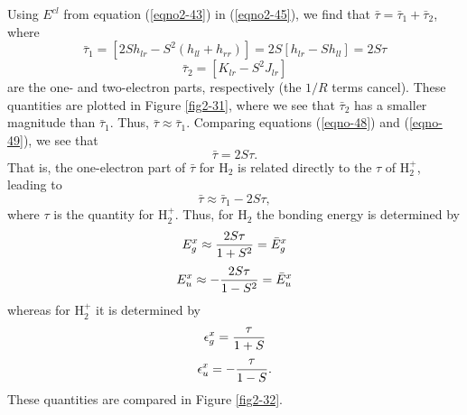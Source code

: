 Using $E^{cl}$ from equation (\ref{eqno2-43}) in (\ref{eqno2-45}), we
find that ${\bar{\tau}} = {\bar{\tau}}_1 + {\bar{\tau}}_2$, where
\begin{equation}
{\bar{\tau}}_1 = \left[ 2 S h_{lr} - S^2 \left( h_{ll} + h_{rr} 
\right) \right] = 2S \left[ h_{lr} - S h_{ll} \right] = 2S \tau
\end{equation}
\begin{equation}
{\bar{\tau}}_2 = \left[ K_{lr} - S^2 J_{lr} \right]
\end{equation}
are the one- and two-electron parts, respectively (the $1/R$ terms
cancel). These quantities are plotted in Figure \ref{fig2-31}, where
we see that ${\bar{\tau}}_2$ has a smaller magnitude than
${\bar{\tau}}_1$.  Thus, ${\bar{\tau}} \approx {\bar{\tau}}_1$.  
Comparing equations (\ref{eqno-48}) and (\ref{eqno-49}), we see that
\begin{equation}
{\bar{\tau}} = 2S \tau.
\end{equation}
That is, the one-electron part of
${\bar{\tau}}$ for H$_2$ is related directly to the $\tau$ of H$^+_2$,
leading to
\begin{equation}
{\bar{\tau}} \approx {\bar{\tau}}_1 - 2S \tau ,
\end{equation}
where $\tau$ is the quantity for H$^+_2$.  Thus, for H$_2$ the bonding 
energy is determined by
\begin{equation}
E^x_g \approx {2S \tau \over 1 + S^2} = {\bar{E}}^x_g
\label{eqno2-50}
\end{equation}
\begin{equation}
E^x_u \approx - {2S \tau \over 1 - S^2} = {\bar{E}}^x_u
\label{eqno2-51}
\end{equation}
whereas for H$^+_2$ it is determined by
\begin{equation}
\epsilon^x_g = {\tau \over 1+S}
\label{eqno2-52}
\end{equation}
\begin{equation}
\epsilon^x_u = - {\tau \over 1 - S}.
\label{eqno2-53}
\end{equation}
These quantities are compared in Figure \ref{fig2-32}.

